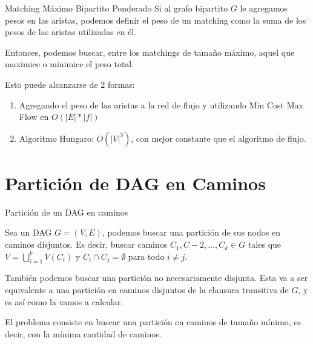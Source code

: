 \documentclass{beamer}
\begin{document}
\begin{frame}{Matching Máximo Bipartito Ponderado}
    Si al grafo bipartito $G$ le agregamos pesos en las aristas, podemos definir el peso de un matching como la suma de los pesos de las aristas utilizadas en él.

    Entonces, podemos buscar, entre los matchings de tamaño máximo, aquel que maximice o minimice el peso total.

    Esto puede alcanzarse de 2 formas:

    \begin{enumerate}
        \item Agregando el peso de las aristas a la red de flujo y utilizando Min Cost Max Flow en $O(|E|*|f|)$
        \item Algoritmo Hungaro: $O(|V|^3)$, con mejor constante que el algoritmo de flujo.
    \end{enumerate}
\end{frame}

\section{Partición de DAG en Caminos}
    \begin{frame}{Partición de un DAG en caminos}
        
        \begin{definition}
           Sea un DAG $G = (V,E)$, podemos buscar una partición de sus nodos en caminos disjuntos. Es decir, buscar caminos $C_1, C-2, ..., C_k \in G$ tales que $V = \bigcup_{i=1}^k V(C_i)$ y $C_i \cap C_j = \emptyset$ para todo $i \neq j$.
        \end{definition}
        
        También podemos buscar una partición no necesariamente disjunta. Esta va a ser equivalente a una partición en caminos disjuntos de la clausura transitiva de $G$, y es así como la vamos a calcular.

        El problema consiste en buscar una partición en caminos de tamaño mínimo, es decir, con la mínima cantidad de caminos.
    \end{frame}
\end{document}
